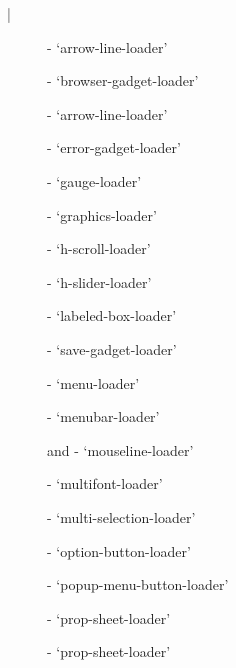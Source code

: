 \begin{figure}
\bar{}
\begin{description}
\item[]  - `arrow-line-loader'

\item[]  - `browser-gadget-loader'

\item[]  - `arrow-line-loader'

\item[]  - `error-gadget-loader'

\item[]  - `gauge-loader'

\item[]  - `graphics-loader'

\item[]  - `h-scroll-loader'

\item[]  - `h-slider-loader'

\item[]  - `labeled-box-loader'

\item[]  - `save-gadget-loader'

\item[]  - `menu-loader'

\item[]  - `menubar-loader'

\item[]  and  - `mouseline-loader'

\item[]  - `multifont-loader'

\item[]  - `multi-selection-loader'

\item[]  - `option-button-loader'

\item[]  - `popup-menu-button-loader'

\item[]  - `prop-sheet-loader'

\item[]  - `prop-sheet-loader'


\end{description}
\end{figure}
